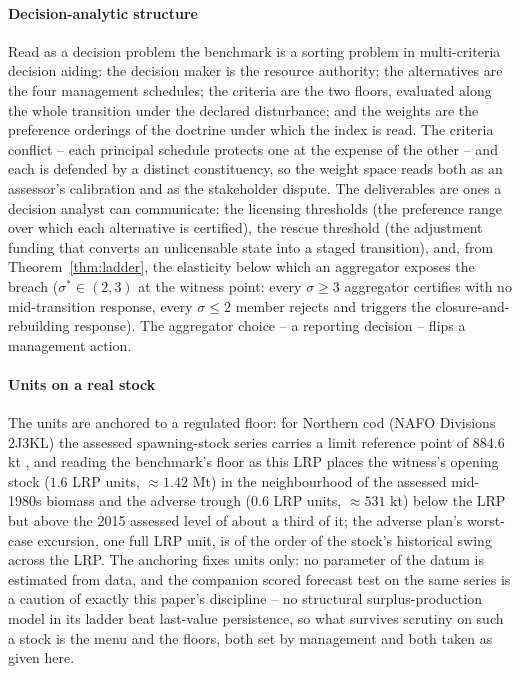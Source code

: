 \documentclass[preprint,11pt,authoryear]{elsarticle}
\theoremstyle{definition}
\theoremstyle{remark}
\begin{document}
\paragraph{Decision-analytic structure} Read as a decision problem the benchmark is a sorting problem in multi-criteria decision aiding: the decision maker is the resource authority; the alternatives are the four management schedules; the criteria are the two floors, evaluated along the whole transition under the declared disturbance; and the weights are the preference orderings of the doctrine under which the index is read. The criteria conflict -- each principal schedule protects one at the expense of the other -- and each is defended by a distinct constituency, so the weight space reads both as an assessor's calibration and as the stakeholder dispute. The deliverables are ones a decision analyst can communicate: the licensing thresholds (the preference range over which each alternative is certified), the rescue threshold (the adjustment funding that converts an unlicensable state into a staged transition), and, from Theorem~\ref{thm:ladder}, the elasticity below which an aggregator exposes the breach ($\sigma^*\in(2,3)$ at the witness point: every $\sigma\ge3$ aggregator certifies with no mid-transition response, every $\sigma\le2$ member rejects and triggers the closure-and-rebuilding response). The aggregator choice -- a reporting decision -- flips a management action.

\paragraph{Units on a real stock} The units are anchored to a regulated floor: for Northern cod (NAFO Divisions 2J3KL) the assessed spawning-stock series carries a limit reference point of $884.6$ kt \citep{DFO2016}, and reading the benchmark's floor as this LRP places the witness's opening stock ($1.6$ LRP units, $\approx1.42$ Mt) in the neighbourhood of the assessed mid-1980s biomass and the adverse trough ($0.6$ LRP units, $\approx531$ kt) below the LRP but above the 2015 assessed level of about a third of it; the adverse plan's worst-case excursion, one full LRP unit, is of the order of the stock's historical swing across the LRP. The anchoring fixes units only: no parameter of the datum is estimated from data, and the companion scored forecast test on the same series \citep{Abaee2026cod} is a caution of exactly this paper's discipline -- no structural surplus-production model in its ladder beat last-value persistence, so what survives scrutiny on such a stock is the menu and the floors, both set by management and both taken as given here.
\end{document}
